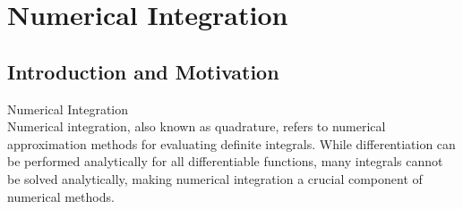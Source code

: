 \section{Numerical Integration}

\subsection{Introduction and Motivation}

\begin{definition}{Numerical Integration}\\
Numerical integration, also known as quadrature, refers to numerical approximation methods for evaluating definite integrals. While differentiation can be performed analytically for all differentiable functions, many integrals cannot be solved analytically, making numerical integration a crucial component of numerical methods.
\end{definition}

